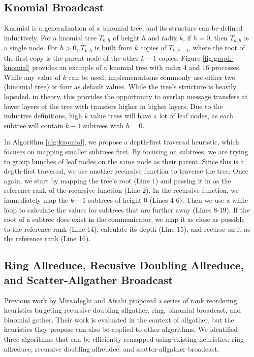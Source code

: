 \subsection{Knomial Broadcast}
Knomial is a generalization of a binomial tree, and its structure can be defined inductively.
For a knomial tree $T_{k,h}$ of height $h$ and radix $k$, if $h=0$, then $T_{k,h}$ is a single node. For $h>0$, $T_{k,h}$ is built from $k$ copies of $T_{k,h-1}$, where the root of the first copy is the parent node of the other $k-1$ copies.
Figure \ref{fig:graph-knomial} provides an example of a knomial tree with radix 4 and 16 processes.
While any value of $k$ can be used, implementations commonly use either two (binomial tree) or four as default values. 
While the tree's structure is heavily lopsided, in theory, this provides the opportunity to overlap message transfers at lower layers of the tree with transfers higher in higher layers.
Due to the inductive definitions, high $k$ value trees will have a lot of leaf nodes, as each subtree will contain $k-1$ subtrees with $h=0$.

In Algorithm \ref{alg:knomial}, we propose a depth-first traversal heuristic, which focuses on mapping smaller subtrees first.
By focusing on subtrees, we are trying to group bunches of leaf nodes on the same node as their parent.
Since this is a depth-first traversal, we use another recursive function to traverse the tree. 
Once again, we start by mapping the tree's root (Line 1) and passing it in as the reference rank of the recursive function (Line 2).
In the recursive function, we immediately map the $k-1$ subtrees of height 0 (Lines 4-6).
Then we use a while loop to calculate the values for subtrees that are further away (Lines 8-19).
If the root of a subtree does exist in the communicator, we map it as close as possible to the reference rank (Line 14), calculate its depth (Line 15), and recurse on it as the reference rank (Line 16).




\subsection{Ring Allreduce, Recusive Doubling Allreduce, and Scatter-Allgather Broadcast}

Previous work by Mirsadeghi and Afsahi \cite{Mirsadeghi2016TopoAwareCollRR} proposed a series of rank reordering heuristics targeting recursive doubling allgather, ring, binomial broadcast, and binomial gather. 
Their work is evaluated in the context of allgather, but the heuristics they propose can also be applied to other algorithms.
We identified three algorithms that can be efficiently remapped using existing heuristics: ring allreduce, recursive doubling allreudce, and scatter-allgather broadcast.

